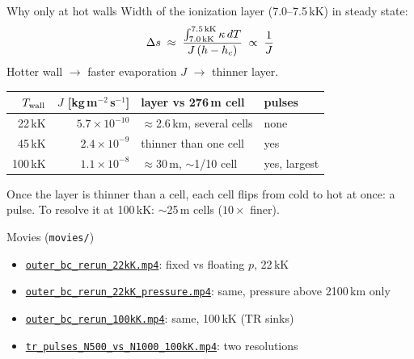 \documentclass[aspectratio=169,11pt]{beamer}
\begin{document}
\begin{frame}{Why only at hot walls}
  Width of the ionization layer (7.0--7.5\,kK) in steady state:
  \[
    \Delta s \;\approx\; \frac{\int_{7.0\,\rm kK}^{7.5\,\rm kK}\kappa\,dT}{J\,(h-h_c)}
    \;\propto\; \frac{1}{J}
  \]
  Hotter wall $\to$ faster evaporation $J$ $\to$ thinner layer.
  \vspace{0.5em}
  \begin{center}
  \begin{tabular}{@{}r r l l@{}}
    \toprule
    $T_{\rm wall}$ & $J$ [kg\,m$^{-2}$\,s$^{-1}$] & layer vs 276\,m cell & pulses \\
    \midrule
    22\,kK  & $5.7\times10^{-10}$ & $\approx$2.6\,km, several cells & none \\
    45\,kK  & $2.4\times10^{-9}$  & thinner than one cell & yes \\
    100\,kK & $1.1\times10^{-8}$  & $\approx$30\,m, $\sim$1/10 cell & yes, largest \\
    \bottomrule
  \end{tabular}
  \end{center}
  \vspace{0.3em}
  Once the layer is thinner than a cell, each cell flips from cold to hot at once:
  a pulse. To resolve it at 100\,kK: $\sim$25\,m cells ($10\times$ finer).
\end{frame}

\begin{frame}{Movies (\texttt{movies/})}
  \begin{itemize}
    \item \href{run:movies/outer_bc_rerun_22kK.mp4}{\texttt{outer\_bc\_rerun\_22kK.mp4}}: fixed vs floating $p$, 22\,kK
    \item \href{run:movies/outer_bc_rerun_22kK_pressure.mp4}{\texttt{outer\_bc\_rerun\_22kK\_pressure.mp4}}: same, pressure above 2100\,km only
    \item \href{run:movies/outer_bc_rerun_100kK.mp4}{\texttt{outer\_bc\_rerun\_100kK.mp4}}: same, 100\,kK (TR sinks)
    \item \href{run:movies/tr_pulses_N500_vs_N1000_100kK.mp4}{\texttt{tr\_pulses\_N500\_vs\_N1000\_100kK.mp4}}: two resolutions
  \end{itemize}
\end{frame}
\end{document}
